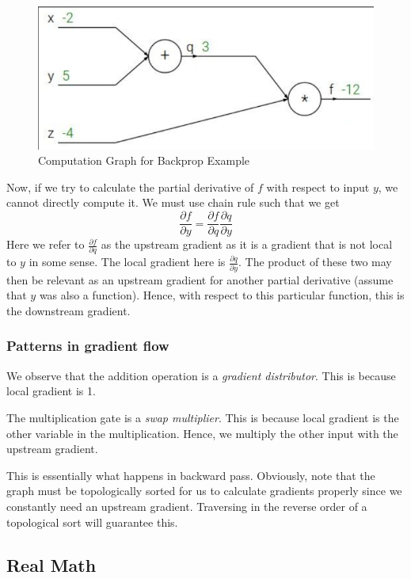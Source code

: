 \begin{figure}[t]
    \centering
    \includegraphics{img/computational-graph.png}
    \caption[width=5cm]{Computation Graph for Backprop Example}
    \label{fig:c_graph}
\end{figure}

Now, if we try to calculate the partial derivative of $f$ with respect to input $y$, we cannot directly compute it. We must use chain rule such that we get \[ \frac{\partial f}{\partial y} = \frac{\partial f}{\partial q} \frac{\partial q}{\partial y} \]
Here we refer to $\frac{\partial f}{\partial q}$ as the upstream gradient as it is a gradient that is not local to $y$ in some sense. The local gradient here is $\frac{\partial q}{\partial y}$. The product of these two may then be relevant as an upstream gradient for another partial derivative (assume that $y$ was also a function). Hence, with respect to this particular function, this is the downstream gradient.

\subsubsection{Patterns in gradient flow}
We observe that the addition operation is a \textit{gradient distributor}. This is because local gradient is 1.

The multiplication gate is a \textit{swap multiplier}. This is because local gradient is the other variable in the multiplication. Hence, we multiply the other input with the upstream gradient.

This is essentially what happens in backward pass. Obviously, note that the graph must be topologically sorted for us to calculate gradients properly since we constantly need an upstream gradient. Traversing in the reverse order of a topological sort will guarantee this.

\subsection{Real Math}


